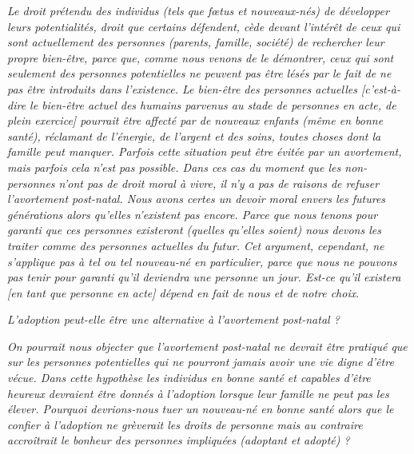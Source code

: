 \begin{displayquote}
\emph{Le droit prétendu des individus (tels que fœtus et nouveaux-nés) de développer leurs potentialités, droit que certains défendent, cède devant l'intérêt de ceux qui sont actuellement des personnes (parents, famille, société) de rechercher leur propre bien-être, parce que, comme nous venons de le démontrer, ceux qui sont seulement des personnes potentielles ne peuvent pas être lésés par le fait de ne pas être introduits dans l'existence. Le bien-être des personnes actuelles \emph{[c'est-à-dire le bien-être actuel des humains parvenus au stade de personnes en acte, de plein exercice]} pourrait être affecté par de nouveaux enfants (même en bonne santé), réclamant de l'énergie, de l'argent et des soins, toutes choses dont la famille peut manquer. Parfois cette situation peut être évitée par un avortement, mais parfois cela n'est pas possible. Dans ces cas du moment que les non-personnes n'ont pas de droit moral à vivre, il n'y a pas de raisons de refuser l'avortement post-natal. Nous avons certes un devoir moral envers les futures générations alors qu'elles n'existent pas encore. Parce que nous tenons pour garanti que ces personnes existeront (quelles qu'elles soient) nous devons les traiter comme des personnes actuelles du futur. Cet argument, cependant, ne s'applique pas à tel ou tel nouveau-né en particulier, parce que nous ne pouvons pas tenir pour garanti qu'il deviendra une personne un jour. Est-ce qu'il existera \emph{[en tant que personne en acte]} dépend en fait de nous et de notre choix}.

\emph{L'adoption peut-elle être une alternative à l'avortement post-natal ?}

\emph{On pourrait nous objecter que l'avortement post-natal ne devrait être pratiqué que sur les personnes potentielles qui ne pourront jamais avoir une vie digne d'être vécue. Dans cette hypothèse les individus en bonne santé et capables d'être heureux devraient être donnés à l'adoption lorsque leur famille ne peut pas les élever. Pourquoi devrions-nous tuer un nouveau-né en bonne santé alors que le confier à l'adoption ne grèverait les droits de personne mais au contraire accroîtrait le bonheur des personnes impliquées (adoptant et adopté) ?}


\end{displayquote}
